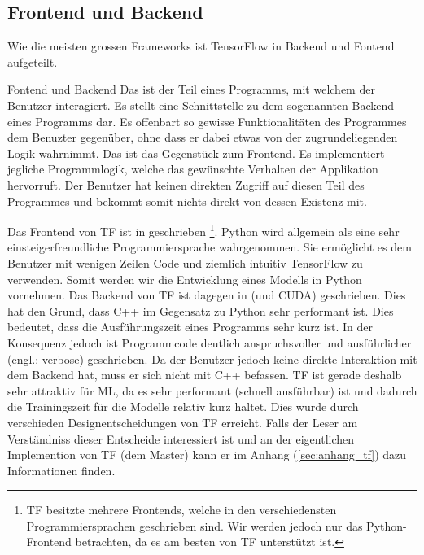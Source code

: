 \para{}
\cite{book:tensorflow}
\cite{net:tf_docs}

\subsection{Frontend und Backend}
Wie die meisten grossen Frameworks ist TensorFlow in Backend und
Fontend aufgeteilt.
\para{}
\begin{infobox}{Fontend und Backend}
  Das  ist der Teil eines Programms, mit welchem der Benutzer
  interagiert. Es stellt eine Schnittstelle zu dem sogenannten Backend eines
  Programms dar. Es offenbart so gewisse Funktionalitäten des Programmes dem
  Benuzter gegenüber, ohne dass er dabei etwas von der zugrundeliegenden Logik wahrnimmt.
  \para{}
  Das  ist das Gegenstück zum Frontend. Es implementiert
  jegliche Programmlogik, welche das gewünschte Verhalten der Applikation
  hervorruft. Der Benutzer hat keinen direkten Zugriff auf diesen Teil des
  Programmes und bekommt somit nichts direkt von dessen Existenz mit.
\end{infobox}
\para{}
Das Frontend von TF ist in  geschrieben%
\footnote{
  TF besitzte mehrere Frontends, welche in den verschiedensten
  Programmiersprachen geschrieben sind. Wir werden jedoch nur das
  Python-Frontend betrachten, da es am besten von TF unterstützt ist.
}.
Python wird allgemein als eine sehr einsteigerfreundliche Programmiersprache wahrgenommen. Sie
ermöglicht es dem Benutzer mit wenigen Zeilen Code und ziemlich intuitiv
TensorFlow zu verwenden. Somit werden wir die Entwicklung eines Modells in
Python vornehmen.
\para{}
Das Backend von TF ist dagegen in  (und CUDA)
geschrieben. Dies hat den Grund, dass C++ im Gegensatz zu Python sehr performant
ist. Dies bedeutet, dass die Ausführungszeit eines Programms sehr kurz ist. In
der Konsequenz jedoch ist Programmcode deutlich anspruchsvoller und
ausführlicher (engl.: verbose) geschrieben.
Da der Benutzer jedoch keine direkte Interaktion mit dem Backend hat, muss er
sich nicht mit C++ befassen.
\para{}
TF ist gerade deshalb sehr attraktiv für ML, da es sehr performant (schnell
ausführbar) ist und dadurch die Trainingszeit für die Modelle relativ
kurz haltet. Dies wurde durch verschieden Designentscheidungen von TF erreicht.
\para{}
Falls der Leser am Verständniss dieser Entscheide interessiert ist und an der
eigentlichen Implemention von TF (dem Master) kann er im Anhang (\ref{sec:anhang_tf}) dazu
Informationen finden.

